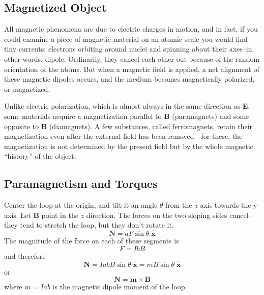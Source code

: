 \documentclass[../../../main.tex]{subfiles}
\begin{document}
\subsection*{Magnetized Object}
All magnetic phenomena are due to electric charges in motion, and in fact, if you could examine a piece of magnetic material on an atomic scale you would ﬁnd tiny currents: electrons orbiting around nuclei and spinning about their axes--in other words, dipole. Ordinarily, they cancel each other out because of the random orientation of the atoms. But when a magnetic ﬁeld is applied, a net alignment of these magnetic dipoles occurs, and the medium becomes magnetically polarized, or magnetized. 

Unlike electric polarization, which is almost always in the same direction as \textbf{E}, some materials acquire a magnetization parallel to \textbf{B} (paramagnets) and some opposite to \textbf{B} (diamagnets). A few substances, called ferromagnets, retain their magnetization even after the external ﬁeld has been removed—for these, the magnetization is not determined by the present ﬁeld but by the whole magnetic “history” of the object.

\subsection*{Paramagnetism and Torques}
Center the loop at the origin, and tilt it an angle $\theta$ from the $z$ axis towards the y-axis. Let \textbf{B} point in the $z$ direction. The forces on the two sloping sides cancel--they tend to stretch the loop, but they don’t rotate it. 
\begin{equation*}
    \mathbf{N} = aF \sin \theta\; \mathbf{\hat{x}}
\end{equation*}
The magnitude of the force on each of these segments is
\begin{equation*}
    F = I bB
\end{equation*}
and therefore
\begin{equation*}
    \mathbf{N} = I abB \sin \theta\; \mathbf{\hat{x}}=mB\sin\theta\;\mathbf{\hat{x}}
\end{equation*}
or
\begin{equation*}
    \mathbf{N}=\mathbf{m}\times\mathbf{B}
\end{equation*}
where $m = I ab$ is the magnetic dipole moment of the loop. 
\begin{figure*}[b]
    \centering
\end{figure*}
\end{document}
